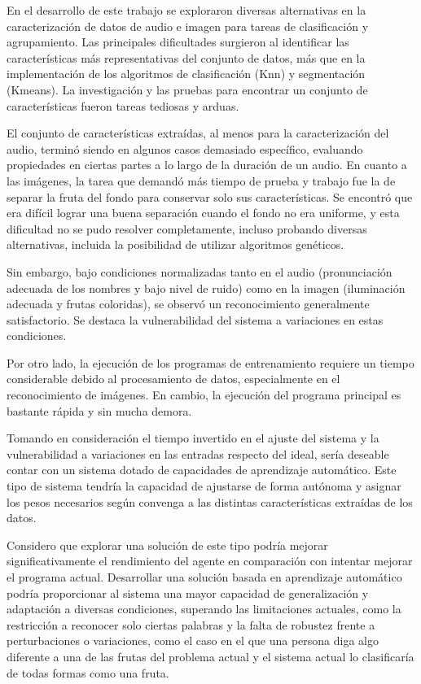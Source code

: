\documentclass[a4paper, 12pt]{article}
\begin{document}
En el desarrollo de este trabajo se exploraron diversas alternativas en la caracterización de datos de audio e imagen para tareas de clasificación y agrupamiento. Las principales dificultades surgieron al identificar las características más representativas del conjunto de datos, más que en la implementación de los algoritmos de clasificación (Knn) y segmentación (Kmeans). La investigación y las pruebas para encontrar un conjunto de características fueron tareas tediosas y arduas.

El conjunto de características extraídas, al menos para la caracterización del audio, terminó siendo en algunos casos demasiado específico, evaluando propiedades en ciertas partes a lo largo de la duración de un audio. En cuanto a las imágenes, la tarea que demandó más tiempo de prueba y trabajo fue la de separar la fruta del fondo para conservar solo sus características. Se encontró que era difícil lograr una buena separación cuando el fondo no era uniforme, y esta dificultad no se pudo resolver completamente, incluso probando diversas alternativas, incluida la posibilidad de utilizar algoritmos genéticos.

Sin embargo, bajo condiciones normalizadas tanto en el audio (pronunciación adecuada de los nombres y bajo nivel de ruido) como en la imagen (iluminación adecuada y frutas coloridas), se observó un reconocimiento generalmente satisfactorio. Se destaca la vulnerabilidad del sistema a variaciones en estas condiciones.

Por otro lado, la ejecución de los programas de entrenamiento requiere un tiempo considerable debido al procesamiento de datos, especialmente en el reconocimiento de imágenes. En cambio, la ejecución del programa principal es bastante rápida y sin mucha demora.

Tomando en consideración el tiempo invertido en el ajuste del sistema y la vulnerabilidad a variaciones en las entradas respecto del ideal, sería deseable contar con un sistema dotado de capacidades de aprendizaje automático. Este tipo de sistema tendría la capacidad de ajustarse de forma autónoma y asignar los pesos necesarios según convenga a las distintas características extraídas de los datos.

Considero que explorar una solución de este tipo podría mejorar significativamente el rendimiento del agente en comparación con intentar mejorar el programa actual. Desarrollar una solución basada en aprendizaje automático podría proporcionar al sistema una mayor capacidad de generalización y adaptación a diversas condiciones, superando las limitaciones actuales, como la restricción a reconocer solo ciertas palabras y la falta de robustez frente a perturbaciones o variaciones, como el caso en el que una persona diga algo diferente a una de las frutas del problema actual y el sistema actual lo clasificaría de todas formas como una fruta.

\printbibliography[title={Referencias}]
\end{document}
